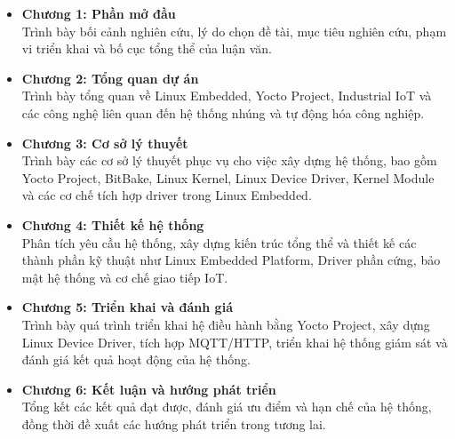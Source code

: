\begin{itemize}

    \item \textbf{Chương 1: Phần mở đầu} \\ 
    Trình bày bối cảnh nghiên cứu, lý do chọn đề tài, mục tiêu nghiên cứu, phạm vi triển khai và bố cục tổng thể của luận văn.

    \item \textbf{Chương 2: Tổng quan dự án} \\ 
    Trình bày tổng quan về Linux Embedded, Yocto Project, Industrial IoT và các công nghệ liên quan đến hệ thống nhúng và tự động hóa công nghiệp.

    \item \textbf{Chương 3: Cơ sở lý thuyết} \\ 
    Trình bày các cơ sở lý thuyết phục vụ cho việc xây dựng hệ thống, bao gồm Yocto Project, BitBake, Linux Kernel, Linux Device Driver, Kernel Module và các cơ chế tích hợp driver trong Linux Embedded.

    \item \textbf{Chương 4: Thiết kế hệ thống} \\ 
    Phân tích yêu cầu hệ thống, xây dựng kiến trúc tổng thể và thiết kế các thành phần kỹ thuật như Linux Embedded Platform, Driver phần cứng, bảo mật hệ thống và cơ chế giao tiếp IoT.

    \item \textbf{Chương 5: Triển khai và đánh giá} \\ 
    Trình bày quá trình triển khai hệ điều hành bằng Yocto Project, xây dựng Linux Device Driver, tích hợp MQTT/HTTP, triển khai hệ thống giám sát và đánh giá kết quả hoạt động của hệ thống.

    \item \textbf{Chương 6: Kết luận và hướng phát triển} \\ 
    Tổng kết các kết quả đạt được, đánh giá ưu điểm và hạn chế của hệ thống, đồng thời đề xuất các hướng phát triển trong tương lai.

\end{itemize}
